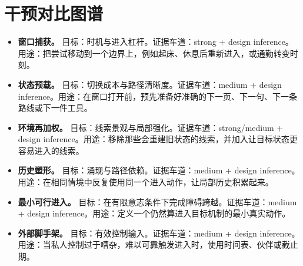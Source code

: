 \section{干预对比图谱}

\begin{itemize}[nosep]
  \item \textbf{窗口捕获。} 目标：时机与进入杠杆。证据车道：strong + design inference。用途：把尝试移动到一个边界上，例如起床、休息后重新进入，或通勤转变时刻。
  \item \textbf{状态预载。} 目标：切换成本与路径清晰度。证据车道：medium + design inference。用途：在窗口打开前，预先准备好准确的下一页、下一句、下一条路线或下一件工具。
  \item \textbf{环境再加权。} 目标：线索景观与局部强化。证据车道：strong/medium + design inference。用途：移除那些会重建旧状态的线索，并加入让目标状态更容易进入的线索。
  \item \textbf{历史塑形。} 目标：涌现与路径依赖。证据车道：medium + design inference。用途：在相同情境中反复使用同一个进入动作，让局部历史积累起来。
  \item \textbf{最小可行进入。} 目标：在有限意志条件下完成障碍跨越。证据车道：medium + design inference。用途：定义一个仍然算进入目标机制的最小真实动作。
  \item \textbf{外部脚手架。} 目标：有效控制输入。证据车道：medium + design inference。用途：当私人控制过于嘈杂，难以可靠触发进入时，使用时间表、伙伴或截止期。
\end{itemize}
